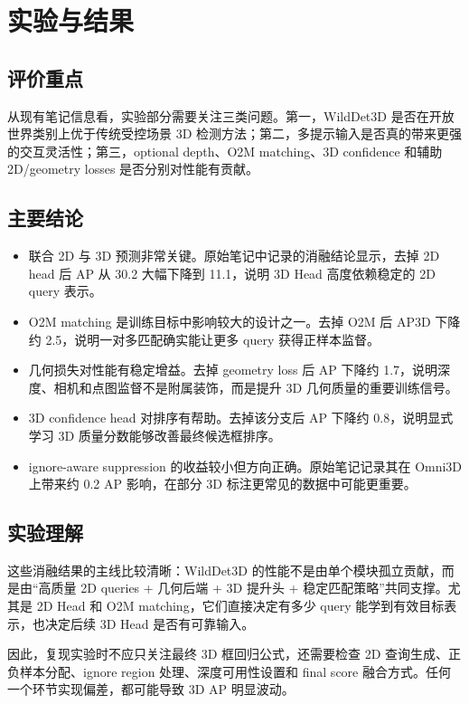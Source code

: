 \section{实验与结果}

\subsection{评价重点}

从现有笔记信息看，实验部分需要关注三类问题。第一，WildDet3D 是否在开放世界类别上优于传统受控场景 3D 检测方法；第二，多提示输入是否真的带来更强的交互灵活性；第三，optional depth、O2M matching、3D confidence 和辅助 2D/geometry losses 是否分别对性能有贡献。

\subsection{主要结论}

\begin{itemize}
    \item 联合 2D 与 3D 预测非常关键。原始笔记中记录的消融结论显示，去掉 2D head 后 AP 从 30.2 大幅下降到 11.1，说明 3D Head 高度依赖稳定的 2D query 表示。
    \item O2M matching 是训练目标中影响较大的设计之一。去掉 O2M 后 AP3D 下降约 2.5，说明一对多匹配确实能让更多 query 获得正样本监督。
    \item 几何损失对性能有稳定增益。去掉 geometry loss 后 AP 下降约 1.7，说明深度、相机和点图监督不是附属装饰，而是提升 3D 几何质量的重要训练信号。
    \item 3D confidence head 对排序有帮助。去掉该分支后 AP 下降约 0.8，说明显式学习 3D 质量分数能够改善最终候选框排序。
    \item ignore-aware suppression 的收益较小但方向正确。原始笔记记录其在 Omni3D 上带来约 0.2 AP 影响，在部分 3D 标注更常见的数据中可能更重要。
\end{itemize}

\subsection{实验理解}

这些消融结果的主线比较清晰：WildDet3D 的性能不是由单个模块孤立贡献，而是由“高质量 2D queries + 几何后端 + 3D 提升头 + 稳定匹配策略”共同支撑。尤其是 2D Head 和 O2M matching，它们直接决定有多少 query 能学到有效目标表示，也决定后续 3D Head 是否有可靠输入。

因此，复现实验时不应只关注最终 3D 框回归公式，还需要检查 2D 查询生成、正负样本分配、ignore region 处理、深度可用性设置和 final score 融合方式。任何一个环节实现偏差，都可能导致 3D AP 明显波动。
